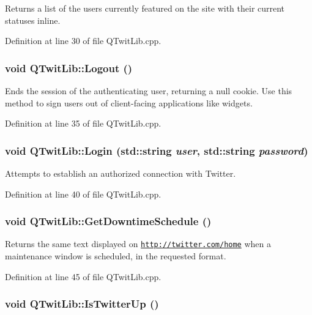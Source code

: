Returns a list of the users currently featured on the site with their current statuses inline. 

Definition at line 30 of file QTwitLib.cpp.\hypertarget{classQTwitLib_c2967d2e8ded282821034f4bc0caa2aa}{
\subsubsection{\setlength{\rightskip}{0pt plus 5cm}void QTwitLib::Logout ()}}
\label{classQTwitLib_c2967d2e8ded282821034f4bc0caa2aa}


Ends the session of the authenticating user, returning a null cookie. Use this method to sign users out of client-facing applications like widgets. 

Definition at line 35 of file QTwitLib.cpp.\hypertarget{classQTwitLib_7d42e8478d2eb87b147cd3df0f8771e8}{
\subsubsection{\setlength{\rightskip}{0pt plus 5cm}void QTwitLib::Login (std::string {\em user}, \/  std::string {\em password})}}
\label{classQTwitLib_7d42e8478d2eb87b147cd3df0f8771e8}


Attempts to establish an authorized connection with Twitter. 

Definition at line 40 of file QTwitLib.cpp.\hypertarget{classQTwitLib_0a8aa39556fc28d406ac4441e551dd50}{
\subsubsection{\setlength{\rightskip}{0pt plus 5cm}void QTwitLib::GetDowntimeSchedule ()}}
\label{classQTwitLib_0a8aa39556fc28d406ac4441e551dd50}


Returns the same text displayed on \href{http://twitter.com/home}{\tt http://twitter.com/home} when a maintenance window is scheduled, in the requested format. 

Definition at line 45 of file QTwitLib.cpp.\hypertarget{classQTwitLib_b2e5ba83065079134755ac6815a58788}{
\subsubsection{\setlength{\rightskip}{0pt plus 5cm}void QTwitLib::IsTwitterUp ()}}
\label{classQTwitLib_b2e5ba83065079134755ac6815a58788}


